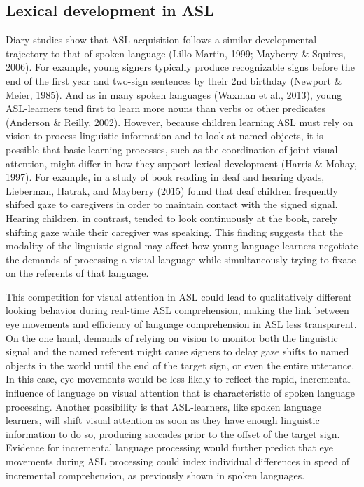\documentclass[oneside]{report}
\begin{document}
\hypertarget{lexical-development-in-asl}{%
\subsection{Lexical development in
ASL}\label{lexical-development-in-asl}}

Diary studies show that ASL acquisition follows a similar developmental
trajectory to that of spoken language (Lillo-Martin, 1999; Mayberry \&
Squires, 2006). For example, young signers typically produce
recognizable signs before the end of the first year and two-sign
sentences by their 2nd birthday (Newport \& Meier, 1985). And as in many
spoken languages (Waxman et al., 2013), young ASL-learners tend first to
learn more nouns than verbs or other predicates (Anderson \& Reilly,
2002). However, because children learning ASL must rely on vision to
process linguistic information and to look at named objects, it is
possible that basic learning processes, such as the coordination of
joint visual attention, might differ in how they support lexical
development (Harris \& Mohay, 1997). For example, in a study of book
reading in deaf and hearing dyads, Lieberman, Hatrak, and Mayberry
(2015) found that deaf children frequently shifted gaze to caregivers in
order to maintain contact with the signed signal. Hearing children, in
contrast, tended to look continuously at the book, rarely shifting gaze
while their caregiver was speaking. This finding suggests that the
modality of the linguistic signal may affect how young language learners
negotiate the demands of processing a visual language while
simultaneously trying to fixate on the referents of that language.

This competition for visual attention in ASL could lead to qualitatively
different looking behavior during real-time ASL comprehension, making
the link between eye movements and efficiency of language comprehension
in ASL less transparent. On the one hand, demands of relying on vision
to monitor both the linguistic signal and the named referent might cause
signers to delay gaze shifts to named objects in the world until the end
of the target sign, or even the entire utterance. In this case, eye
movements would be less likely to reflect the rapid, incremental
influence of language on visual attention that is characteristic of
spoken language processing. Another possibility is that ASL-learners,
like spoken language learners, will shift visual attention as soon as
they have enough linguistic information to do so, producing saccades
prior to the offset of the target sign. Evidence for incremental
language processing would further predict that eye movements during ASL
processing could index individual differences in speed of incremental
comprehension, as previously shown in spoken languages.
\end{document}

